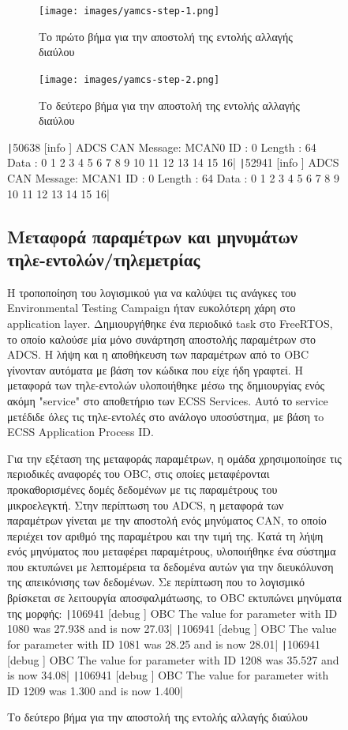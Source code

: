 \documentclass[a4paper,nobib,justified]{tufte-book}
\begin{document}
\begin{figure}
\begin{figure}
	\texttt{[image: images/yamcs-step-1.png]}
	\label{fig:yamcs-step-1}
	\caption{Το πρώτο βήμα για την αποστολή της εντολής αλλαγής διαύλου}
\end{figure}
\begin{figure}
	\texttt{[image: images/yamcs-step-2.png]}
	\label{fig:yamcs-step-2}
	\caption{Το δεύτερο βήμα για την αποστολή της εντολής αλλαγής διαύλου}
\end{figure}

\texttt|50638 [info     ] ADCS     CAN Message: MCAN0 ID : 0 Length : 64 Data : 0 1 2 3 4 5 6 7 8 9 10 11 12 13 14 15 16|
\texttt|52941 [info     ] ADCS     CAN Message: MCAN1 ID : 0 Length : 64 Data : 0 1 2 3 4 5 6 7 8 9 10 11 12 13 14 15 16|

\subsection{Μεταφορά παραμέτρων και μηνυμάτων τηλε-εντολών/τηλεμετρίας}
Η τροποποίηση του λογισμικού για να καλύψει τις ανάγκες του Environmental Testing Campaign ήταν ευκολότερη χάρη στο application layer. Δημιουργήθηκε ένα περιοδικό task στο FreeRTOS, το οποίο καλούσε μία μόνο συνάρτηση αποστολής παραμέτρων στο ADCS. Η λήψη και η αποθήκευση των παραμέτρων από το OBC γίνονταν αυτόματα με βάση τον κώδικα που είχε ήδη γραφτεί. Η μεταφορά των τηλε-εντολών υλοποιήθηκε μέσω της δημιουργίας ενός ακόμη "service" στο αποθετήριο των ECSS Services.  Αυτό το service μετέδιδε όλες τις τηλε-εντολές στο ανάλογο υποσύστημα, με βάση τo ECSS Application Process ID.

Για την εξέταση της μεταφοράς παραμέτρων, η ομάδα χρησιμοποίησε τις περιοδικές αναφορές του OBC, στις οποίες μεταφέρονται προκαθορισμένες δομές δεδομένων με τις παραμέτρους του μικροελεγκτή. Στην περίπτωση του ADCS, η μεταφορά των παραμέτρων γίνεται με την αποστολή ενός μηνύματος CAN, το οποίο περιέχει τον αριθμό της παραμέτρου και την τιμή της. Κατά τη λήψη ενός μηνύματος που μεταφέρει παραμέτρους, υλοποιήθηκε ένα σύστημα που εκτυπώνει με λεπτομέρεια τα δεδομένα αυτών για την διευκόλυνση της απεικόνισης των δεδομένων. Σε περίπτωση που το λογισμικό βρίσκεται σε λειτουργία αποσφαλμάτωσης, το OBC εκτυπώνει μηνύματα της μορφής:
\texttt|106941 [debug    ] OBC      The value for parameter with ID 1080 was 27.938 and is now 27.03|
\texttt|106941 [debug    ] OBC      The value for parameter with ID 1081 was 28.25 and is now 28.01|
\texttt|106941 [debug    ] OBC      The value for parameter with ID 1208 was 35.527 and is now 34.08|
\texttt|106941 [debug    ] OBC      The value for parameter with ID 1209 was 1.300 and is now 1.400|


\end{figure}
\end{document}
